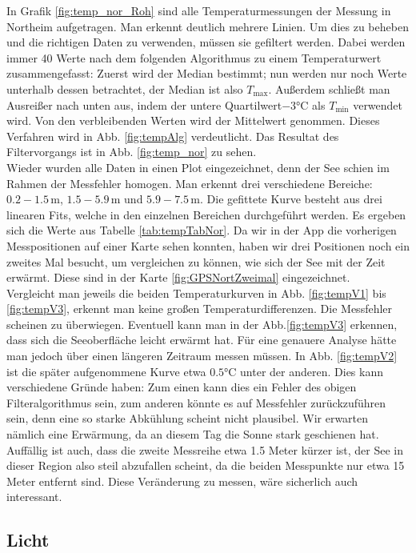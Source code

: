 \documentclass[12pt,a4paper,titlepage,headinclude,bibtotoc]{scrartcl}
\numberwithin{equation}{subsection}
\begin{document}
In Grafik \ref{fig:temp_nor_Roh} sind alle Temperaturmessungen der Messung in Northeim aufgetragen.
Man erkennt deutlich mehrere Linien.
Um dies zu beheben und die richtigen Daten zu verwenden, müssen sie gefiltert werden.
Dabei werden immer 40 Werte nach dem folgenden Algorithmus zu einem Temperaturwert zusammengefasst: 
Zuerst wird der Median bestimmt; nun werden nur noch Werte unterhalb dessen betrachtet, der Median ist also $T_\text{max}$. 
Außerdem schließt man Ausreißer nach unten aus, indem der untere Quartilwert$-3\si{\celsius}$ als $T_\text{min}$ verwendet wird.
Von den verbleibenden Werten wird der Mittelwert genommen.
Dieses Verfahren wird in Abb. \ref{fig:tempAlg} verdeutlicht.
Das Resultat des Filtervorgangs ist in Abb. \ref{fig:temp_nor} zu sehen.\\
Wieder wurden alle Daten in einen Plot eingezeichnet, denn der See schien  im Rahmen der Messfehler homogen.
Man erkennt drei verschiedene Bereiche: $0.2-1.5\,$m, $1.5-5.9\,$m und $5.9-7.5\,$m.
Die gefittete Kurve besteht aus drei linearen Fits, welche in den einzelnen Bereichen durchgeführt werden.
Es ergeben sich die Werte aus Tabelle \ref{tab:tempTabNor}.
Da wir in der App die vorherigen Messpositionen auf einer Karte sehen konnten, haben wir drei Positionen noch ein zweites Mal besucht, um vergleichen zu können, wie sich der See mit der Zeit erwärmt.
Diese sind in der Karte \ref{fig:GPSNortZweimal} eingezeichnet.\\
Vergleicht man jeweils die beiden Temperaturkurven in Abb. \ref{fig:tempV1} bis \ref{fig:tempV3}, erkennt man keine großen Temperaturdifferenzen.
Die Messfehler scheinen zu überwiegen.
Eventuell kann man in der Abb.\ref{fig:tempV3} erkennen, dass sich die Seeoberfläche leicht erwärmt hat.
Für eine genauere Analyse hätte man jedoch über einen längeren Zeitraum messen müssen.
In Abb. \ref{fig:tempV2} ist die später aufgenommene Kurve etwa $0.5\si\celsius$ unter der anderen.
Dies kann verschiedene Gründe haben: Zum einen kann dies ein Fehler des obigen Filteralgorithmus sein, zum anderen könnte es auf Messfehler zurückzuführen sein, denn eine so starke Abkühlung scheint nicht plausibel.
Wir erwarten nämlich eine Erwärmung, da an diesem Tag die Sonne stark geschienen hat.
Auffällig ist auch, dass die zweite Messreihe etwa 1.5 Meter kürzer ist, der See in dieser Region also steil abzufallen scheint, da die beiden Messpunkte nur etwa 15 Meter entfernt sind.
Diese Veränderung zu messen, wäre sicherlich auch interessant.

\subsection{Licht}
\end{document}

